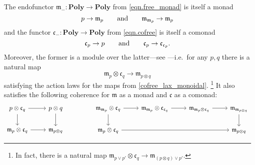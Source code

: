 \documentclass[11pt, one side, article]{memoir}
\theoremstyle{definition}
\theoremstyle{plain}
\newcommand{\Cat}[1]{\mathbf{#1}}%
\newcommand{\To}[2][]{\xrightarrow[#1]{\tn{$#2$}}}
\newcommand{\tn}[1]{\textnormal{#1}}
\newcommand{\smset}{\Cat{Set}}
\newcommand{\yon}{{\mathcal{y}}}
\newcommand{\poly}{\Cat{Poly}}
\newcommand{\0}{\textsf{0}}
\newcommand{\1}{\tn{\textsf{1}}}
\newcommand{\tri}{\mathbin{\triangleleft}}
\newcommand{\cofree}{\mathfrak{c}}
\newcommand{\free}{\mathfrak{m}}
\newcommand{\hh}[2][]{#1 \tn{#2} #1}
\newcommand{\qqand}{\hh[\qquad]{and}}
\newcommand{\OR}{\curlyvee}
\begin{document}
The endofunctor $\free_-\colon\poly\to\poly$ from \cref{eqn.free_monad} is itself a monad
\begin{equation}
	p\to\free_p
	\qqand
	\free_{\free_p}\to\free_p
\end{equation}
and the functor $\cofree_-\colon\poly\to\poly$ from \cref{eqn.cofree} is itself a comonad
\begin{equation}
	\cofree_p\to p
	\qqand
	\cofree_p\to\cofree_{\cofree_p}. 
\end{equation}
Moreover, the former is a module over the latter---see \cite{libkind2024pattern}---i.e.\ for any $p,q$ there is a natural map
\begin{equation}\label{module_easy}
  \free_p\otimes\cofree_q\to\free_{p\otimes q}
\end{equation}
satisfying the action laws for the maps from \cref{cofree_lax_monoidal}.%
\footnote{In fact, there is a natural map $\free_{p\vee p'}\otimes\cofree_{q}\to\free_{(p\otimes q)\vee p'}$.}
  It also satisfies the following coherence for $\free$ as a monad and $\cofree$ as a comonad:
\begin{equation}\label{eqn.monad_comonad_coherence}
\begin{tikzcd}
  p\otimes\cofree_q\ar[r]\ar[d]&p\otimes q\ar[d]\\
  \free_p\otimes\cofree_q\ar[r]&\free_{p\otimes q}
\end{tikzcd}
\hspace{.6in}
\begin{tikzcd}
	\free_{\free_p}\otimes\cofree_q\ar[d]\ar[r]&
	\free_{\free_p}\otimes\cofree_{\cofree_q}\ar[r]&
	\free_{\free_p\otimes\cofree_q}\ar[r]&
	\free_{\free_{p\otimes q}}\ar[d]\\
	\free_p\otimes\cofree_q\ar[rrr]&&&
	\free_{p\otimes q}
\end{tikzcd}
\end{equation}
%
%
\end{document}
